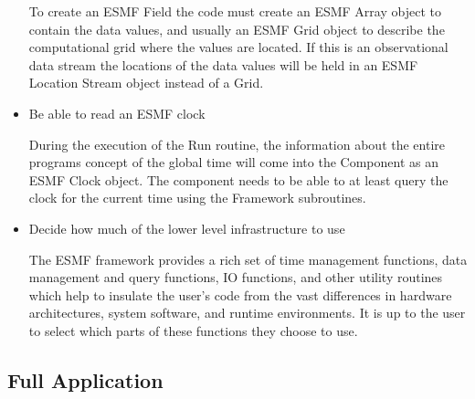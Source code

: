 \begin{itemize}
To create an ESMF Field the code must create an ESMF Array object to
contain the data values, and usually an ESMF Grid object to describe the
computational grid where the values are located.  If this is an
observational data stream the locations of the data values will be held in
an ESMF Location Stream object instead of a Grid.

\item Be able to read an ESMF clock

During the execution of the Run routine, the information about the
entire programs concept of the global time will come into the Component
as an ESMF Clock object.  The component needs to be able to at least
query the clock for the current time using the Framework subroutines.

\item Decide how much of the lower level infrastructure to use

The ESMF framework provides a rich set of time management functions,
data management and query functions, IO functions, and other utility
routines which help to insulate the user's code from the vast differences
in hardware architectures, system software, and runtime environments.
It is up to the user to select which parts of these functions they
choose to use.

\end{itemize}

\subsection{Full Application}

